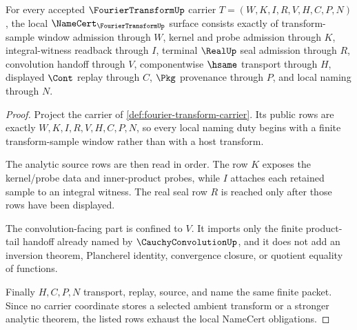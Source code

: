 \begin{theorem}\label{thm:fourier-transform-namecert-obligations}
For every accepted $\FourierTransformUp$ carrier $T=(W,K,I,R,V,H,C,P,N)$, the local $\NameCert_{\FourierTransformUp}$ surface consists exactly of transform-sample window admission through $W$, kernel and probe admission through $K$, integral-witness readback through $I$, terminal $\RealUp$ seal admission through $R$, convolution handoff through $V$, componentwise $\hsame$ transport through $H$, displayed $\Cont$ replay through $C$, $\Pkg$ provenance through $P$, and local naming through $N$.
\end{theorem}
\begin{proof}
Project the carrier of \autoref{def:fourier-transform-carrier}. Its public rows are exactly $W,K,I,R,V,H,C,P,N$, so every local naming duty begins with a finite transform-sample window rather than with a host transform.

The analytic source rows are then read in order. The row $K$ exposes the kernel/probe data and inner-product probes, while $I$ attaches each retained sample to an integral witness. The real seal row $R$ is reached only after those rows have been displayed.

The convolution-facing part is confined to $V$. It imports only the finite product-tail handoff already named by $\CauchyConvolutionUp$, and it does not add an inversion theorem, Plancherel identity, convergence closure, or quotient equality of functions.

Finally $H,C,P,N$ transport, replay, source, and name the same finite packet. Since no carrier coordinate stores a selected ambient transform or a stronger analytic theorem, the listed rows exhaust the local NameCert obligations.
\end{proof}

